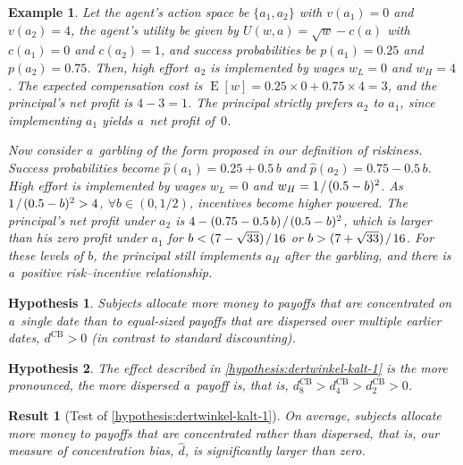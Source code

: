 \documentclass[11pt, a4paper, oneside]{article}
\newcommand*{\divslash}{%
	\mathbin{%
		\nonscript\mskip-2mu / \nonscript\mskip-2mu%
	}%
}  %
\theoremstyle{Plain}
\theoremstyle{Definition}
\newtheorem{example}{Beispiel}
\newtheorem{hypothesis}{Hypothese}
\newtheorem{result}{Resultat}
\newtheorem{example}{Example}
\newtheorem{hypothesis}{Hypothesis}
\newtheorem{result}{Result}
\theoremstyle{Remark}
\begin{document}
\begin{example}
	\label{example:budde-kraekel-2}
	Let the agent's action space be $\{a_1, a_2\}$ with ${v(a_1) = 0}$ and
	${v(a_2) = 4}$, the agent's utility be given by ${U(w, a) = \sqrt{w} - c(a)}$ with ${c(a_1) = 0}$ and ${c(a_2) = 1}$, and success probabilities be ${p(a_1) = 0.25}$ and ${p(a_2) = 0.75}$. Then, high effort~$a_2$ is implemented by wages ${w_L = 0}$ and ${w_H = 4}$. The expected compensation cost is ${\operatorname{E}[w] = 0.25 \times 0 + 0.75 \times 4 = 3}$, and the principal's net profit is ${4 - 3 = 1}$. The principal strictly prefers $a_2$ to $a_1$, since implementing $a_1$ yields a~net profit of~$0$. \par
	Now consider a~garbling of the form proposed in our definition of riskiness. Success probabilities become ${\hat{p}(a_1) = 0.25 + 0.5\,b}$ and ${\hat{p}(a_2) = 0.75 - 0.5\,b}$. High effort is implemented by wages ${w_L = 0}$ and ${w_H = 1 \divslash (0.5 - b)^2}$. As ${1 \divslash (0.5 - b)^2 > 4}$, ${\forall b \in (0, 1/2)}$, incentives become higher powered. The principal's net profit under $a_2$ is ${4 - (0.75 - 0.5\,b) \divslash (0.5 - b)^2}$, which is larger than his zero profit under $a_1$ for ${b < (7 - \sqrt{33}) \divslash 16}$ or ${b > (7 + \sqrt{33}) \divslash 16}$. For these levels of $b$, the principal still implements $a_H$ after the garbling, and there is a~positive risk--incentive relationship.
\end{example}

\begin{hypothesis}
	\label{hypothesis:dertwinkel-kalt-1}
	Subjects allocate more money to payoffs that are concentrated on a~single date than to equal-sized payoffs that are dispersed over multiple earlier dates, ${d^{\mathrm{CB}} > 0}$ (in contrast to standard discounting).
\end{hypothesis}

\begin{hypothesis}
	\label{hypothesis:dertwinkel-kalt-2}
	The effect described in \autoref{hypothesis:dertwinkel-kalt-1} is the more pronounced, the more dispersed a~payoff is, that is, ${d^{\mathrm{CB}}_8 > d^{\mathrm{CB}}_4 > d^{\mathrm{CB}}_2 > 0}$.
\end{hypothesis}

\begin{result}[Test of \autoref{hypothesis:dertwinkel-kalt-1}]
	\label{result:dertwinkel-kalt-1}
	On average, subjects allocate more money to payoffs that are concentrated rather than dispersed, that is, our measure of concentration bias, $\hat{d}$, is significantly larger than zero.
\end{result}
\end{document}
